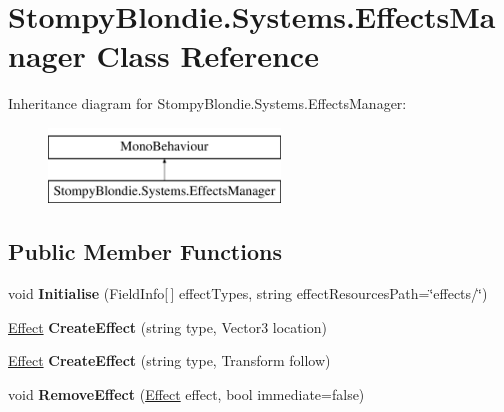\hypertarget{class_stompy_blondie_1_1_systems_1_1_effects_manager}{}\section{Stompy\+Blondie.\+Systems.\+Effects\+Manager Class Reference}
\label{class_stompy_blondie_1_1_systems_1_1_effects_manager}
Inheritance diagram for Stompy\+Blondie.\+Systems.\+Effects\+Manager\+:\begin{figure}[H]
\begin{center}
\leavevmode
\includegraphics[height=2.000000cm]{class_stompy_blondie_1_1_systems_1_1_effects_manager}
\end{center}
\end{figure}
\subsection*{Public Member Functions}
\begin{DoxyCompactItemize}
\item 
\mbox{\label{class_stompy_blondie_1_1_systems_1_1_effects_manager_a168066de1a7b2fb68fe1e8aad700e095}} 
void {\bfseries Initialise} (Field\+Info\mbox{[}$\,$\mbox{]} effect\+Types, string effect\+Resources\+Path=\char`\"{}effects/\char`\"{})
\item 
\mbox{\label{class_stompy_blondie_1_1_systems_1_1_effects_manager_ac8421abe668767bdca76cfdcc61fc398}} 
\mbox{\hyperlink{class_stompy_blondie_1_1_systems_1_1_effect}{Effect}} {\bfseries Create\+Effect} (string type, Vector3 location)
\item 
\mbox{\label{class_stompy_blondie_1_1_systems_1_1_effects_manager_ab75dc8e99a16fa5950b1e7e95d41f810}} 
\mbox{\hyperlink{class_stompy_blondie_1_1_systems_1_1_effect}{Effect}} {\bfseries Create\+Effect} (string type, Transform follow)
\item 
\mbox{\label{class_stompy_blondie_1_1_systems_1_1_effects_manager_a904acd1941627e0cb611586d220179a9}} 
void {\bfseries Remove\+Effect} (\mbox{\hyperlink{class_stompy_blondie_1_1_systems_1_1_effect}{Effect}} effect, bool immediate=false)
\end{DoxyCompactItemize}
